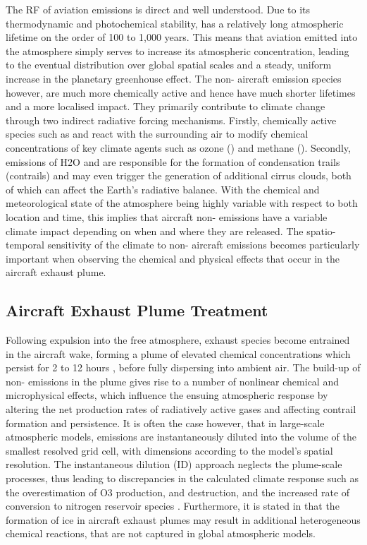 The RF of aviation  emissions is direct and well understood. Due to its thermodynamic and photochemical stability,  has a relatively long atmospheric lifetime on the order of 100 to 1,000 years. This means that aviation  emitted into the atmosphere simply serves to increase its atmospheric concentration, leading to the eventual distribution over global spatial scales and a steady, uniform increase in the planetary greenhouse effect. 
The non- aircraft emission species however, are much more chemically active and hence have much shorter lifetimes and a more localised impact. They primarily contribute to climate change through two indirect radiative forcing mechanisms. Firstly, chemically active species such as  and  react with the surrounding air to modify chemical concentrations of key climate agents such as ozone () and methane (). Secondly, emissions of H2O and  are responsible for the formation of condensation trails (contrails) and may even trigger the generation of additional cirrus clouds, both of which can affect the Earth's radiative balance. With the chemical and meteorological state of the atmosphere being highly variable with respect to both location and time, this implies that aircraft non- emissions have a variable climate impact depending on when and where they are released. The spatio-temporal sensitivity of the climate to non- aircraft emissions becomes particularly important when observing the chemical and physical effects that occur in the aircraft exhaust plume. 

  
\subsection{Aircraft Exhaust Plume Treatment}
Following expulsion into the free atmosphere, exhaust species become entrained in the aircraft wake, forming a plume of elevated chemical concentrations which persist for 2 to 12 hours \cite{EPA1992}, before fully dispersing into ambient air. The build-up of non- emissions in the plume gives rise to a number of nonlinear chemical and microphysical effects, which influence the ensuing atmospheric response by altering the net production rates of radiatively active gases and affecting contrail formation and persistence. It is often the case however, that in large-scale atmospheric models, emissions are instantaneously diluted into the volume of the smallest resolved grid cell, with dimensions according to the model's spatial resolution. The instantaneous dilution (ID) approach neglects the plume-scale processes, thus leading to discrepancies in the calculated climate response such as the overestimation of O3 production,  and  destruction, and the increased rate of  conversion to nitrogen reservoir species \cite{Petry1998}. Furthermore, it is stated in \cite{Fritz2020} that the formation of ice in aircraft exhaust plumes may result in additional heterogeneous chemical reactions, that are not captured in global atmospheric models. 

